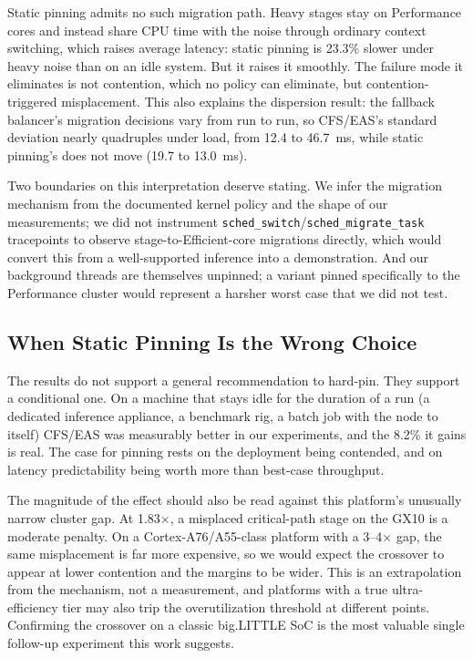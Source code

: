 \documentclass[conference]{IEEEtran}
\begin{document}
Static pinning admits no such migration path. Heavy stages stay on Performance cores and instead share CPU time with the noise through ordinary context switching, which raises average latency: static pinning is 23.3\% slower under heavy noise than on an idle system. But it raises it smoothly. The failure mode it eliminates is not contention, which no policy can eliminate, but contention-triggered misplacement. This also explains the dispersion result: the fallback balancer's migration decisions vary from run to run, so CFS/EAS's standard deviation nearly quadruples under load, from 12.4 to 46.7~ms, while static pinning's does not move (19.7 to 13.0~ms).

Two boundaries on this interpretation deserve stating. We infer the migration mechanism from the documented kernel policy and the shape of our measurements; we did not instrument \texttt{sched\_switch}/\texttt{sched\_migrate\_task} tracepoints to observe stage-to-Efficient-core migrations directly, which would convert this from a well-supported inference into a demonstration. And our background threads are themselves unpinned; a variant pinned specifically to the Performance cluster would represent a harsher worst case that we did not test.

\subsection{When Static Pinning Is the Wrong Choice}
\label{sec:whenwrong}
The results do not support a general recommendation to hard-pin. They support a conditional one. On a machine that stays idle for the duration of a run (a dedicated inference appliance, a benchmark rig, a batch job with the node to itself) CFS/EAS was measurably better in our experiments, and the 8.2\% it gains is real. The case for pinning rests on the deployment being contended, and on latency predictability being worth more than best-case throughput.

The magnitude of the effect should also be read against this platform's unusually narrow cluster gap. At 1.83$\times$, a misplaced critical-path stage on the GX10 is a moderate penalty. On a Cortex-A76/A55-class platform with a 3--4$\times$ gap, the same misplacement is far more expensive, so we would expect the crossover to appear at lower contention and the margins to be wider. This is an extrapolation from the mechanism, not a measurement, and platforms with a true ultra-efficiency tier may also trip the overutilization threshold at different points. Confirming the crossover on a classic big.LITTLE SoC is the most valuable single follow-up experiment this work suggests.
\end{document}
